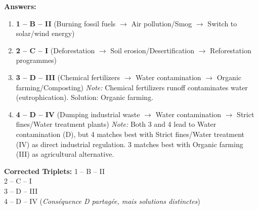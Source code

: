 \documentclass[11pt]{article}
\begin{document}
\begin{corrige}
\textbf{Answers:}
\begin{enumerate}
\item \textbf{1 -- B -- II} (Burning fossil fuels $\rightarrow$ Air pollution/Smog $\rightarrow$ Switch to solar/wind energy)
\item \textbf{2 -- C -- I} (Deforestation $\rightarrow$ Soil erosion/Desertification $\rightarrow$ Reforestation programmes)
\item \textbf{3 -- D -- III} (Chemical fertilizers $\rightarrow$ Water contamination $\rightarrow$ Organic farming/Composting) 
      \textit{Note:} Chemical fertilizers runoff contaminates water (eutrophication). Solution: Organic farming.
\item \textbf{4 -- D -- IV} (Dumping industrial waste $\rightarrow$ Water contamination $\rightarrow$ Strict fines/Water treatment plants)
      \textit{Note:} Both 3 and 4 lead to Water contamination (D), but 4 matches best with Strict fines/Water treatment (IV) as direct industrial regulation. 3 matches best with Organic farming (III) as agricultural alternative.
\end{enumerate}
\textbf{Corrected Triplets:}
1 -- B -- II \\
2 -- C -- I \\
3 -- D -- III \\
4 -- D -- IV \quad (\textit{Conséquence D partagée, mais solutions distinctes})
\end{corrige}
\end{document}

